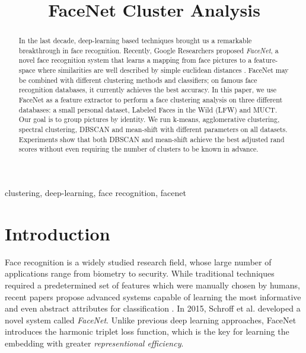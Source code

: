 \documentclass[conference]{IEEEtran}
\begin{document}
\title{FaceNet Cluster Analysis}

\author{
}


\maketitle

\begin{abstract}
In the last decade, deep-learning based techniques brought us a remarkable breakthrough in face recognition.
Recently, Google Researchers proposed \textit{FaceNet}, a novel face recognition system that learns a mapping from face pictures to a feature-space where similarities are well described by simple euclidean distances \cite{b1}.
FaceNet may be combined with different clustering methods and classifiers; on famous face recognition databases, it currently achieves the best accuracy.
In this paper, we use FaceNet as a feature extractor to perform a face clustering analysis on three different databases: a small personal dataset, Labeled Faces in the Wild (LFW) and MUCT.
Our goal is to group pictures by identity.
We run k-means, agglomerative clustering, spectral clustering, DBSCAN and mean-shift with different parameters on all datasets.
Experiments show that both DBSCAN and mean-shift achieve the best adjusted rand scores without even requiring the number of clusters to be known in advance.

\end{abstract}

\begin{IEEEkeywords}
clustering, deep-learning, face recognition, facenet
\end{IEEEkeywords}

\section{Introduction}

Face recognition is a widely studied research field, whose large number of applications range from biometry to security.
While traditional techniques required a predetermined set of features which were manually chosen by humans, recent papers propose advanced systems capable of learning the most informative and even abstract attributes for classification \cite{b6}.
In 2015, Schroff et al. \cite{b1} developed a novel system called \textit{FaceNet}.
Unlike previous deep learning approaches, FaceNet introduces the harmonic triplet loss function, which is the key for learning the embedding with greater \textit{representional efficiency}.
\end{document}
